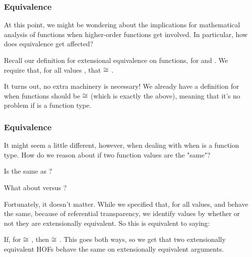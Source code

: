 \documentclass[aspectratio=169]{beamer}
\begin{document}

\begin{frame}[fragile]
  \frametitle{Equivalence}

  At this point, we might be wondering about the implications for mathematical
  analysis of functions when higher-order functions get involved. In particular,
  how does equivalence get affected?

  \pause
  \vspace{\fill}

  Recall our definition for extensional equivalence on functions, for 
  and . We require that, for all values , that
   $\cong$ .

  \pause
  \vspace{\fill}

  It turns out, no extra machinery is necessary! We already have a definition for
  when functions should be $\cong$ (which is exactly the above), meaning that it's
  no problem if  is a function type.
\end{frame}

\begin{frame}[fragile]
  \frametitle{Equivalence}

  It might seem a little different, however, when dealing with when  is
  a function type. How do we reason about if two function values are the "same"?

  \pause
  \vspace{\fill}

  Is  the same as ?

  \pause
  \vspace{\fill}

  What about  versus ?

  \pause
  \vspace{\fill}

  Fortunately, it doesn't matter. While we specified that, for all values, 
  and  behave the same, because of referential transparency, we identify values
  by whether or not they are extensionally equivalent. So this is equivalent to saying:

  \pause
  \vspace{\fill}

  If, for  $\cong$ , then  $\cong$ . This goes
  both ways, so we get that two extensionally equivalent HOFs behave the same on
  extensionally equivalent arguments.
\end{frame}
\end{document}
